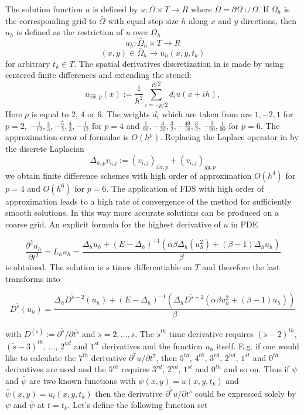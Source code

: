 \documentclass[11pt,a4paper,twoside]{article}
\begin{document}
The solution function $u$ is defined by $u : \bar \Omega \times T \rightarrow  R$ where $\bar \Omega = \partial \Omega \cup \Omega$. If $\Omega_h$ is the corresponding grid to $\bar \Omega$ with equal step size $h$ along $x$ and $y$ directions, then $u_h$ is defined as the restriction of $u$ over $\Omega_h$
$$u_h : \bar \Omega_h \times T \rightarrow  R$$
$$ (x,y) \in \bar \Omega_h \rightarrow u_h(x,y, t_k)$$
for arbitrary $t_k \in T$. The spatial derivatives discretization in  is made by using centered finite differences and extending the stencil:
\begin{equation}\label{fd}
u_{\widehat{xx},p}(x) :=  \frac{1}{h^2} \sum\limits_{i=-p/2}^{p/2} d_i u(x+ih),
\end{equation}
 Here $p$ is equal to $2$, $4$ or $6$.  The weights $d_i$ which are taken from \cite{forn} are  
 $ 1,-2,1$ for $p=2$, $-\frac{1}{12}, \frac{4}{3}, -\frac{5}{2}, \frac{4}{3}, -\frac{1}{12}$ for $p=4$ and  $\frac{1}{90}, -\frac{3}{20}, \frac{3}{2}, -\frac{49}{18}, \frac{3}{2}, -\frac{3}{20}, \frac{1}{90}$ for $p=6$. The approximation error of  formulae  is $O(h^p)$. Replacing the Laplace operator in  by the discrete Laplacian 
$$ \Delta_{h,p} v_{i,j} := (v_{i,j})_{\widehat{xx},p} + (v_{i,j})_{\widehat{yy},p}$$ 
we obtain finite difference schemes with high order of approximation $O(h^4)$ for $p=4$ and  $O(h^6)$ for $p=6 $.  The application of FDS with high order of approximation leads to a high rate of convergence of the method for sufficiently smooth solutions. In this way more accurate solutions can be produced on a coarse grid. An explicit formula for the highest derivative of $u$ in PDE  

\begin{equation}\label{Leq}
\frac{ \partial^2 u_h }{ \partial t^2 } = L_h u_h = \frac{ \Delta_h u_h + (E - \Delta_h)^{-1} ( \alpha \beta \Delta_h( u_h^2) + (\beta -1)\Delta_h u_h) }{\beta}
\end{equation}
is obtained. The solution is $s$ times differentiable on $T$ and therefore the last transforms into

\begin{equation}\label{DLeq}
D^{\tilde s} (u_h) =\frac{ \Delta_h D^{\tilde s - 2}(u_h) + (E - \Delta_h)^{-1}( \Delta_h D^{\tilde s - 2} ( \alpha \beta u_h^2  + (\beta -1)u_h) )  }{\beta} 
\end{equation}

with $D^{(\tilde s)} := \partial^{\tilde s} / \partial t^{\tilde s}$ and $\tilde s = 2,...,s$. The $\tilde s^{th}$ time derivative requires $(\tilde s-2)^{th}$, $(\tilde s-3)^{th}$, ..., $2^{nd}$ and $1^{st}$ derivatives and the function $u_h$ itself. E.g. if one would like to calculate the $7^{th}$ derivative $\partial^7 u / \partial t^7$, then $5^{th}$, $4^{th}$, $3^{rd}$, $2^{nd}$, $1^{st}$ and $0^{th}$ derivatives are used and the $5^{th}$ requires  $3^{rd}$, $2^{nd}$, $1^{st}$ and $0^{th}$ and so on.  Thus if $\psi$ and $\bar \psi$ are two known functions with $\psi(x,y) = u(x,y, t_k)$ and $\bar \psi(x,y) = u_t(x,y, t_k)$ then the derivative $\partial^{\tilde s} u / \partial t^{\tilde s}$ could be expressed solely by $\psi$ and $\bar \psi$ at $t = t_k$. Let's define the following function set
\end{document}
